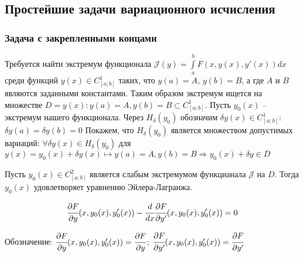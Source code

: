     \subsection{Простейшие задачи вариационного исчисления}
    \subsubsection{Задача с закрепленными концами}

    Требуется найти экстремум функционала $\mathcal{J} (y) = \int \limits^b_a F(x, y(x), y'(x)) dx$ среди функций $y(x) \in C^1_{[a;b]}$ таких, что $y(a) = A$, $y(b) = B$, а где $A$ и $B$ являются заданными константами.
    Таким образом экстремум ищется на множестве $D = {y(x): y(a) = A, y(b) = B} \subset C^1_{[a;b]}$. Пусть $y_0(x)$ -- экстремум нашего функционала. 
    Через $H_{\delta}(y_0)$ обозначим $\delta y(x) \in C^1_{[a;b]}$: $\delta y(a) = \delta y(b) = 0$ 
    Покажем, что $H_{\delta}(y_0)$ является множеством допустимых вариаций: $\forall \delta y(x) \in H_{\delta}(y_0)$ для $y(x) = y_0(x) + \delta y(x) \mapsto y(a) = A, y(b) = B \Rightarrow y_0(x) + \delta y \in D$
    
    \begin{theorem}
        Пусть $y_0(x) \in C^2_{[a;b]}$ является слабым экстремумом функцианала $\mathcal{J}$ на $D$. Тогда $y_0(x)$ удовлетворяет уравнению Эйлера-Лагранжа.
        
        \begin{equation} \label{issue15:IF}
            \cfrac{\partial F}{\partial y}(x, y_0(x), y'_0(x)) - \cfrac{d}{dx} \cfrac{\partial F}{\partial y'} (x, y_0(x), y'_0(x)) = 0
        \end{equation}

        Обозначение: $\cfrac{\partial F}{\partial y}(x, y_0(x), y'_0(x)) = \cfrac{\partial F}{\partial y}$; $\cfrac{\partial F}{\partial y'} (x, y_0(x), y'_0(x)) = \cfrac{\partial F}{\partial y'}$

    \end{theorem}

